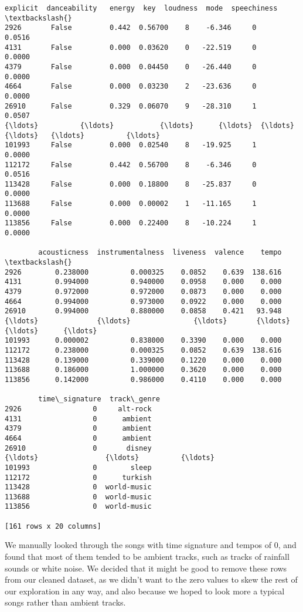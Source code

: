 \documentclass[11pt]{article}
\begin{document}
\begin{tcolorbox}[breakable, size=fbox, boxrule=.5pt, pad at break*=1mm, opacityfill=0]
\begin{Verbatim}[commandchars=\\\{\}]
        explicit  danceability   energy  key  loudness  mode  speechiness  \textbackslash{}
2926       False         0.442  0.56700    8    -6.346     0       0.0516
4131       False         0.000  0.03620    0   -22.519     0       0.0000
4379       False         0.000  0.04450    0   -26.440     0       0.0000
4664       False         0.000  0.03230    2   -23.636     0       0.0000
26910      False         0.329  0.06070    9   -28.310     1       0.0507
{\ldots}          {\ldots}           {\ldots}      {\ldots}  {\ldots}       {\ldots}   {\ldots}          {\ldots}
101993     False         0.000  0.02540    8   -19.925     1       0.0000
112172     False         0.442  0.56700    8    -6.346     0       0.0516
113428     False         0.000  0.18800    8   -25.837     0       0.0000
113688     False         0.000  0.00002    1   -11.165     1       0.0000
113856     False         0.000  0.22400    8   -10.224     1       0.0000

        acousticness  instrumentalness  liveness  valence    tempo  \textbackslash{}
2926        0.238000          0.000325    0.0852    0.639  138.616
4131        0.994000          0.940000    0.0958    0.000    0.000
4379        0.972000          0.972000    0.0873    0.000    0.000
4664        0.994000          0.973000    0.0922    0.000    0.000
26910       0.994000          0.880000    0.0858    0.421   93.948
{\ldots}              {\ldots}               {\ldots}       {\ldots}      {\ldots}      {\ldots}
101993      0.000002          0.838000    0.3390    0.000    0.000
112172      0.238000          0.000325    0.0852    0.639  138.616
113428      0.139000          0.339000    0.1220    0.000    0.000
113688      0.186000          1.000000    0.3620    0.000    0.000
113856      0.142000          0.986000    0.4110    0.000    0.000

        time\_signature  track\_genre
2926                 0     alt-rock
4131                 0      ambient
4379                 0      ambient
4664                 0      ambient
26910                0       disney
{\ldots}                {\ldots}          {\ldots}
101993               0        sleep
112172               0      turkish
113428               0  world-music
113688               0  world-music
113856               0  world-music

[161 rows x 20 columns]
\end{Verbatim}
\end{tcolorbox}
        
    We manually looked through the songs with time signature and tempos of
0, and found that most of them tended to be ambient tracks, such as
tracks of rainfall sounds or white noise. We decided that it might be
good to remove these rows from our cleaned dataset, as we didn't want to
the zero values to skew the rest of our exploration in any way, and also
because we hoped to look more a typical songs rather than ambient
tracks.
\end{document}
